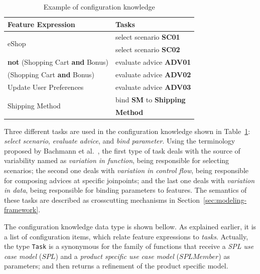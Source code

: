 \begin{table}[htb]
\begin{small}
\begin{tabular}{||lp{1.4in}||}
\hline
Feature Expression  						& Tasks					 \\ \hline \hline

\multirow{2}{*}{eShop}						& select scenario {\bf SC01} \\
											& select scenario {\bf SC02} \\	 \hline
{\bf not} (Shopping Cart {\bf and} Bonus) 	& evaluate advice {\bf ADV01} \\ \hline 
(Shopping Cart {\bf and} Bonus) 		& evaluate advice {\bf ADV02} 	\\   \hline
Update User Preferences 				& evaluate advice {\bf ADV03} \\     \hline 
\multirow{2}{*}{Shipping Method}		& bind {\bf SM} to {\bf Shipping} \\  
										& {\bf Method}\\ \hline
								
\end{tabular}
\end{small}
\caption{Example of configuration knowledge}
\label{tab:eshop-ck}
\end{table}

{\color{red}Three different tasks are used in the configuration knowledge shown
in Table~\ref{tab:eshop-ck}: \emph{select scenario}, \emph{evaluate advice}, and
\emph{bind parameter}. Using the terminology proposed by Bachmann et
al.~\cite{Bachmann:2001aa}, the first type of task deals with the source of
variability named as \emph{variation in function}, being responsible for
selecting scenarios; the second one deals with \emph{variation in control flow},
being responsible for composing advices at specific joinpoints; and the last one
deals with \emph{variation in data}, being responsible for binding parameters to
features. The semantics of these tasks are described as crosscutting mechanisms
in Section~\ref{sec:modeling-framework}.}

{\color{red} The configuration knowledge data type is shown bellow. As explained
earlier, it is a list of configuration items, which relate feature expressions to
\emph{tasks}. Actually, the type \texttt{Task} is a synonymous for the
family of functions that receive a \emph{SPL use case model} ($SPL$) and a \emph{product
specific use case model} ($SPLMember$) as parameters; and then returns a
refinement of the product specific model.}
 
